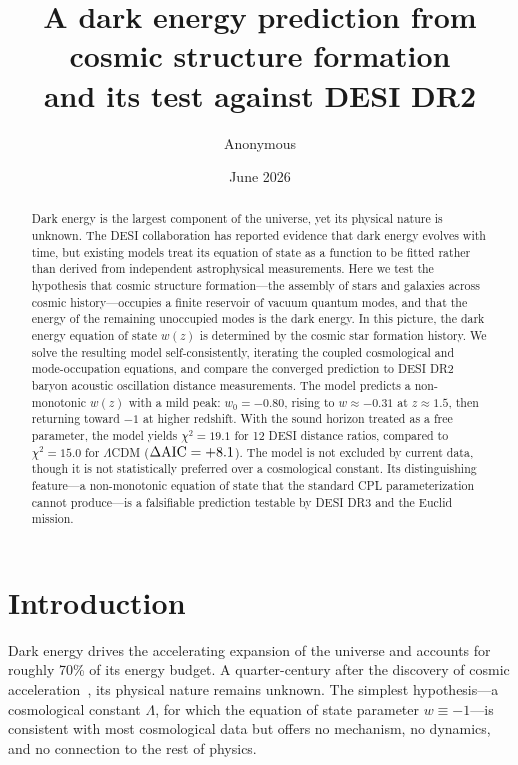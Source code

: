 \documentclass[12pt,a4paper]{article}
\begin{document}
\title{\bf A dark energy prediction from cosmic structure formation\\
and its test against DESI DR2}

\author{Anonymous}
\date{June 2026}

\maketitle

\begin{abstract}
Dark energy is the largest component of the universe, yet its physical nature is unknown. The DESI collaboration has reported evidence that dark energy evolves with time, but existing models treat its equation of state as a function to be fitted rather than derived from independent astrophysical measurements. Here we test the hypothesis that cosmic structure formation---the assembly of stars and galaxies across cosmic history---occupies a finite reservoir of vacuum quantum modes, and that the energy of the remaining unoccupied modes is the dark energy. In this picture, the dark energy equation of state $w(z)$ is determined by the cosmic star formation history. We solve the resulting model self-consistently, iterating the coupled cosmological and mode-occupation equations, and compare the converged prediction to DESI DR2 baryon acoustic oscillation distance measurements. The model predicts a non-monotonic $w(z)$ with a mild peak: $w_0=-0.80$, rising to $w\approx-0.31$ at $z\approx1.5$, then returning toward $-1$ at higher redshift. With the sound horizon treated as a free parameter, the model yields $\chi^2=19.1$ for 12 DESI distance ratios, compared to $\chi^2=15.0$ for $\Lambda$CDM ($\Delta{\rm AIC}=+8.1$). The model is not excluded by current data, though it is not statistically preferred over a cosmological constant. Its distinguishing feature---a non-monotonic equation of state that the standard CPL parameterization cannot produce---is a falsifiable prediction testable by DESI DR3 and the Euclid mission.
\end{abstract}

\section*{Introduction}

Dark energy drives the accelerating expansion of the universe and accounts for roughly 70\% of its energy budget. A quarter-century after the discovery of cosmic acceleration~\cite{riess1998,spergel2003}, its physical nature remains unknown. The simplest hypothesis---a cosmological constant $\Lambda$, for which the equation of state parameter $w\equiv-1$---is consistent with most cosmological data but offers no mechanism, no dynamics, and no connection to the rest of physics.
\end{document}
